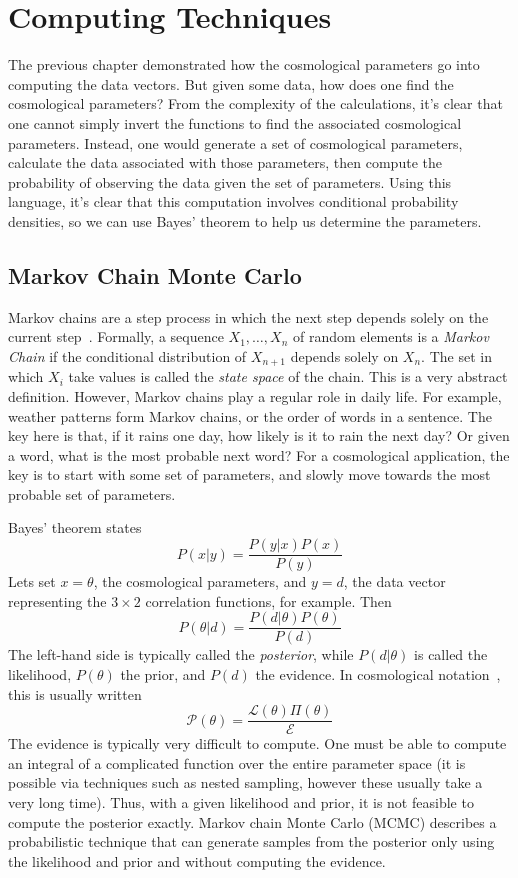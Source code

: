 \chapter{Computing Techniques}
The previous chapter demonstrated how the cosmological parameters go into computing the data vectors. But given some data, how does one find the cosmological parameters? From the complexity of the calculations, it's clear that one cannot simply invert the functions to find the associated cosmological parameters. Instead, one would generate a set of cosmological parameters, calculate the data associated with those parameters, then compute the probability of observing the data given the set of parameters. Using this language, it's clear that this computation involves conditional probability densities, so we can use Bayes' theorem to help us determine the parameters.

\section{Markov Chain Monte Carlo}
Markov chains are a step process in which the next step depends solely on the current step~\cite{agrahari_monte_2021}. Formally, a
sequence $X_1,\hdots,X_n$ of random elements is a \textit{Markov Chain} if the conditional distribution  of $X_{n+1}$ depends solely on $X_n$. The set in which $X_i$ take values is called the \textit{state space} of the chain. This is a very abstract definition. However, Markov chains play a regular role in daily life. For example, weather patterns form Markov chains, or the order of words in a sentence. The key here is that, if it rains one day, how likely is it to rain the next day? Or given a word, what is the most probable next word? For a cosmological application, the key is to start with some set of parameters, and slowly move towards the most probable set of parameters.

Bayes' theorem states
\begin{equation}
	P(x|y) = \frac{P(y|x) P(x)}{P(y)}
\end{equation}
Lets set $x=\theta$, the cosmological parameters, and $y=d$, the data vector representing the $3\times 2$ correlation functions, for example. Then
\begin{equation}
	P(\theta|d) = \frac{P(d|\theta) P(\theta)}{P(d)}
\end{equation}
The left-hand side is typically called the \textit{posterior}, while $P(d|\theta)$ is called the likelihood, $P(\theta)$ the prior, and $P(d)$ the evidence. In cosmological notation~\cite{raveri_non-gaussian_2021}, this is usually written
\begin{equation}
	\mathcal{P}(\theta) = \frac{\mathcal{L}(\theta) \Pi(\theta)}{\mathcal{E}}
\end{equation}
The evidence is typically very difficult to compute. One must be able to compute an integral of a complicated function over the entire parameter space (it is possible via techniques such as nested sampling, however these usually take a very long time). Thus, with a given likelihood and prior, it is not feasible to compute the posterior exactly. Markov chain Monte Carlo (MCMC) describes a probabilistic technique that can generate samples from the posterior only using the likelihood and prior and without computing the evidence.
